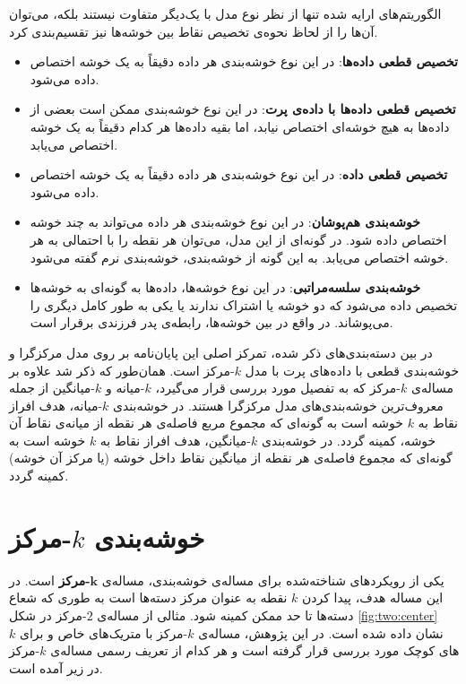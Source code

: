الگوریتم‌های ارایه شده تنها از نظر نوع مدل با یک‌دیگر متفاوت نیستند بلکه، می‌توان آن‌ها را از لحاظ نحوه‌ی تخصیص نقاط بین خوشه‌ها نیز تقسیم‌بندی کرد.
\begin{itemize}
\item \textbf{تخصیص قطعی داده‌ها}:
در این نوع خوشه‌بندی هر داده دقیقاً به یک خوشه اختصاص داده می‌شود.
\item \textbf{تخصیص قطعی داده‌ها با داده‌ی پرت}:
در این نوع خوشه‌بندی ممکن است بعضی از داده‌ها به هیچ خوشه‌ای اختصاص نیابد، اما بقیه داده‌ها هر کدام دقیقاً به یک خوشه اختصاص می‌یابد.
\item \textbf{تخصیص قطعی داده}:
در این نوع خوشه‌بندی هر داده دقیقاً به یک خوشه اختصاص داده می‌شود.
\item \textbf{خوشه‌بندی هم‌پوشان}:
در این نوع خوشه‌بندی هر داده می‌تواند به چند خوشه اختصاص داده شود. در گونه‌ای از این مدل، می‌توان هر نقطه را با احتمالی به هر خوشه اختصاص می‌یابد. به این گونه از خوشه‌بندی، خوشه‌بندی نرم گفته می‌شود.
\item \textbf{خوشه‌بندی سلسه‌مراتبی}:
در این نوع خوشه‌ها، داده‌ها به گونه‌ای به خوشه‌ها تخصیص داده می‌شود که دو خوشه یا اشتراک ندارند یا یکی به طور کامل دیگری را می‌پوشاند. در واقع در بین خوشه‌ها، رابطه‌ی پدر فرزندی برقرار است.
\end{itemize}

در بین دسته‌بندی‌های ذکر شده، تمرکز اصلی این پایان‌نامه بر روی مدل مرکزگرا و خوشه‌بندی قطعی با داده‌های پرت با مدل $k$-مرکز است. همان‌طور که ذکر شد علاوه بر مساله‌ی $k$-مرکز که به تفصیل مورد بررسی قرار می‌گیرد، $k$-میانه و $k$-میانگین از جمله معروف‌ترین خوشه‌بندی‌های مدل مرکزگرا هستند. در خوشه‌بندی $k$-میانه، هدف افراز نقاط به $k$ خوشه است به گونه‌ای که مجموع مربع فاصله‌ی هر نقطه از میانه‌ی نقاط آن خوشه، کمینه گردد. در خوشه‌بندی $k$-میانگین، هدف افراز نقاط به $k$ خوشه است به گونه‌ای که مجموع فاصله‌ی هر نقطه از میانگین نقاط داخل خوشه (یا مرکز آن خوشه) کمینه گردد. 

\section{خوشه‌بندی $k$-مرکز}
یکی از رویکردهای شناخته‌شده برای مساله‌ی خوشه‌بندی، مساله‌ی \textbf{$\boldsymbol{k}$-مرکز} است. در این مساله هدف، پیدا کردن $k$ نقطه به عنوان مرکز دسته‌ها است به طوری که شعاع دسته‌ها تا حد ممکن کمینه شود. مثالی از مساله‌ی $2$-مرکز در شکل \ref{fig:two:center} نشان داده شده است. در این پژوهش، مساله‌ی $k$-مرکز با متریک‌های خاص و برای $k$های کوچک مورد بررسی قرار گرفته است و هر کدام از‌ تعریف رسمی مساله‌ی $k$-مرکز در زیر آمده است.

